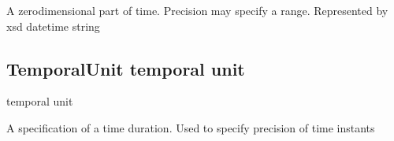 \documentclass[letterpaper,10pt,english]{sphinxmanual}
\begin{document}
\begin{sphinxShadowBox}

\sphinxAtStartPar
A zero\sphinxhyphen{}dimensional part of time.  Precision may specify a range.  Represented by xsd datetime string
\end{sphinxShadowBox}

\begin{sphinxShadowBox}

\sphinxAtStartPar
{}
\end{sphinxShadowBox}
\begin{quote}

\ignorespaces \end{quote}


\subsection{TemporalUnit \sphinxhyphen{} temporal unit}
\label{\detokenize{doc-TemporalUnit:temporalunit-temporal-unit}}\label{\detokenize{doc-TemporalUnit:index-0}}\label{\detokenize{doc-TemporalUnit::doc}}
\begin{sphinxShadowBox}

\sphinxAtStartPar
temporal unit
\end{sphinxShadowBox}

\begin{sphinxShadowBox}

\sphinxAtStartPar
{\hyperref[\detokenize{doc-BFO_0000038::doc}]{}}
\end{sphinxShadowBox}

\begin{sphinxShadowBox}

\sphinxAtStartPar
A specification of a time duration.  Used to specify precision of time instants
\end{sphinxShadowBox}

\begin{sphinxShadowBox}

\sphinxAtStartPar
{}
\end{sphinxShadowBox}
\end{document}
